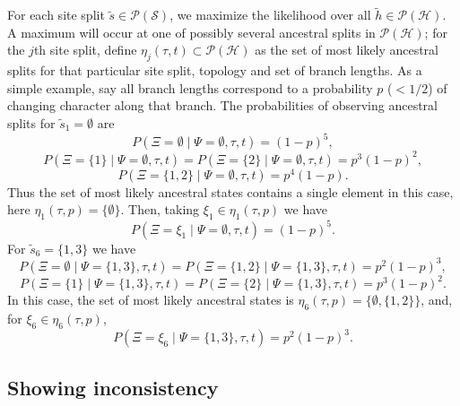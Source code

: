 \documentclass[a4paper]{article}
\newcommand{\siteSplit}{\tilde{s}}
\newcommand{\siteSplitSet}{\mathcal{S}}
\newcommand{\ancestralSplit}{\tilde{h}}
\newcommand{\ancestralSplitSet}{\mathcal{H}}
\newcommand{\ancestralSplitPartition}{\eta}
\newcommand{\siteSplitRV}{\Psi}
\newcommand{\ancestralSplitRV}{\Xi}
\begin{document}
For each site split $\siteSplit\in\mathcal{P}(\siteSplitSet)$, we maximize the likelihood over all $\ancestralSplit\in\mathcal{P}(\ancestralSplitSet)$.
A maximum will occur at one of possibly several ancestral splits in $\mathcal{P}(\ancestralSplitSet)$; for the $j$th site split, define $\ancestralSplitPartition_j(\tau, t)\subset\mathcal{P}(\ancestralSplitSet)$ as the set of most likely ancestral splits for that particular site split, topology and set of branch lengths.
As a simple example, say all branch lengths correspond to a probability $p$ ($< 1/2$) of changing character along that branch.
The probabilities of observing ancestral splits for $\siteSplit_1=\emptyset$ are
$$
P(\ancestralSplitRV=\emptyset \mid \siteSplitRV=\emptyset, \tau, t) =
(1-p)^5,
$$
$$
P(\ancestralSplitRV=\{1\} \mid \siteSplitRV=\emptyset, \tau, t) =
P(\ancestralSplitRV=\{2\} \mid \siteSplitRV=\emptyset, \tau, t) =
p^3(1-p)^2,
$$
$$
P(\ancestralSplitRV=\{1,2\} \mid \siteSplitRV=\emptyset, \tau, t) =
p^4(1-p).
$$
Thus the set of most likely ancestral states contains a single element in this case, here $\ancestralSplitPartition_1(\tau, p)=\{\emptyset\}$.
Then, taking $\xi_1\in\ancestralSplitPartition_1(\tau, p)$ we have
$$
P(\ancestralSplitRV=\xi_1 \mid \siteSplitRV=\emptyset, \tau, t) =
(1-p)^5.
$$
For $\siteSplit_6=\{1,3\}$ we have
$$
P(\ancestralSplitRV=\emptyset \mid \siteSplitRV=\{1,3\}, \tau, t) =
P(\ancestralSplitRV=\{1,2\} \mid \siteSplitRV=\{1,3\}, \tau, t) =
p^2(1-p)^3,
$$
$$
P(\ancestralSplitRV=\{1\} \mid \siteSplitRV=\{1,3\}, \tau, t) =
P(\ancestralSplitRV=\{2\} \mid \siteSplitRV=\{1,3\}, \tau, t) =
p^3(1-p)^2.
$$
In this case, the set of most likely ancestral states is $\ancestralSplitPartition_6(\tau, p)=\{\emptyset,\{1,2\}\}$, and, for $\xi_6\in\ancestralSplitPartition_6(\tau, p)$,
$$
P(\ancestralSplitRV=\xi_6 \mid \siteSplitRV=\{1,3\}, \tau, t) =
p^2(1-p)^3.
$$

\subsection{Showing inconsistency}
\end{document}
